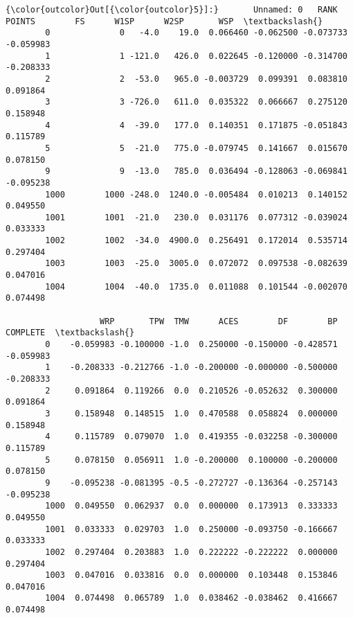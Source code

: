 \documentclass[11pt]{article}
\begin{document}
\begin{Verbatim}[commandchars=\\\{\}]
{\color{outcolor}Out[{\color{outcolor}5}]:}       Unnamed: 0   RANK  POINTS        FS      W1SP      W2SP       WSP  \textbackslash{}
        0              0   -4.0    19.0  0.066460 -0.062500 -0.073733 -0.059983   
        1              1 -121.0   426.0  0.022645 -0.120000 -0.314700 -0.208333   
        2              2  -53.0   965.0 -0.003729  0.099391  0.083810  0.091864   
        3              3 -726.0   611.0  0.035322  0.066667  0.275120  0.158948   
        4              4  -39.0   177.0  0.140351  0.171875 -0.051843  0.115789   
        5              5  -21.0   775.0 -0.079745  0.141667  0.015670  0.078150   
        9              9  -13.0   785.0  0.036494 -0.128063 -0.069841 -0.095238   
        1000        1000 -248.0  1240.0 -0.005484  0.010213  0.140152  0.049550   
        1001        1001  -21.0   230.0  0.031176  0.077312 -0.039024  0.033333   
        1002        1002  -34.0  4900.0  0.256491  0.172014  0.535714  0.297404   
        1003        1003  -25.0  3005.0  0.072072  0.097538 -0.082639  0.047016   
        1004        1004  -40.0  1735.0  0.011088  0.101544 -0.002070  0.074498   
        
                   WRP       TPW  TMW      ACES        DF        BP  COMPLETE  \textbackslash{}
        0    -0.059983 -0.100000 -1.0  0.250000 -0.150000 -0.428571 -0.059983   
        1    -0.208333 -0.212766 -1.0 -0.200000 -0.000000 -0.500000 -0.208333   
        2     0.091864  0.119266  0.0  0.210526 -0.052632  0.300000  0.091864   
        3     0.158948  0.148515  1.0  0.470588  0.058824  0.000000  0.158948   
        4     0.115789  0.079070  1.0  0.419355 -0.032258 -0.300000  0.115789   
        5     0.078150  0.056911  1.0 -0.200000  0.100000 -0.200000  0.078150   
        9    -0.095238 -0.081395 -0.5 -0.272727 -0.136364 -0.257143 -0.095238   
        1000  0.049550  0.062937  0.0  0.000000  0.173913  0.333333  0.049550   
        1001  0.033333  0.029703  1.0  0.250000 -0.093750 -0.166667  0.033333   
        1002  0.297404  0.203883  1.0  0.222222 -0.222222  0.000000  0.297404   
        1003  0.047016  0.033816  0.0  0.000000  0.103448  0.153846  0.047016   
        1004  0.074498  0.065789  1.0  0.038462 -0.038462  0.416667  0.074498   
        

\end{Verbatim}
\end{document}
